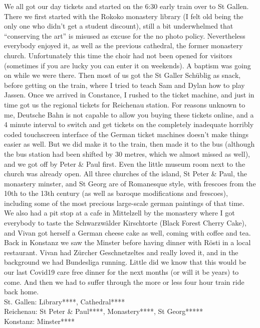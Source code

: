 We all got our day tickets and started on the 6:30 early train over to St Gallen. There we first started with the Rokoko monastery library (I felt old being the only one who didn't get a student discount), still a bit underwhelmed that ``conserving the art'' is misused as excuse for the no photo policy. Nevertheless everybody enjoyed it, as well as the previous cathedral, the former monastery church. Unfortunately this time the choir had not been opened for visitors (sometimes if you are lucky you can enter it on weekends). A baptism was going on while we were there. Then most of us got the St Galler Sch\"ublig as snack, before getting on the train, where I tried to teach Sam and Dylan how to play Jassen. Once we arrived in Constance, I rushed to the ticket machine, and just in time got us the regional tickets for Reichenau station. For reasons unknown to me, Deutsche Bahn is not capable to allow you buying these tickets online, and a 4 minute interval to switch and get tickets on the completely inadequate horribly coded touchscreen interface of the German ticket machines doesn't make things easier as well. But we did make it to the train, then made it to the bus (although the bus station had been shifted by 30 metres, which we almost missed as well), and we got off by Peter \& Paul first. Even the little museum room next to the church was already open. All three churches of the island, St Peter \& Paul, the monastery minster, and St Georg are of Romanesque style, with frescoes from the 10th to the 13th century (as well as baroque modifications and frescoes), including some of the most precious large-scale german paintings of that time. We also had a pit stop at a cafe in Mittelzell by the monastery where I got everybody to taste the Schwarzw\"alder Kirschtorte (Black Forest Cherry Cake), and Vivan got herself a German cheese cake as well, coming with coffee and tea.\\
Back in Konstanz we saw the Minster before having dinner with R\"osti in a local restaurant. Vivan had Z\"urcher Geschnetzeltes and really loved it, and in the background we had Bundesliga running. Little did we know that this would be our last Covid19 care free dinner for the next months (or will it be years) to come. And then we had to suffer through the more or less four hour train ride back home.\\

St. Gallen: Library****, Cathedral****\\
Reichenau: St Peter \& Paul****, Monastery****, St Georg*****\\
Konstanz: Minster****

